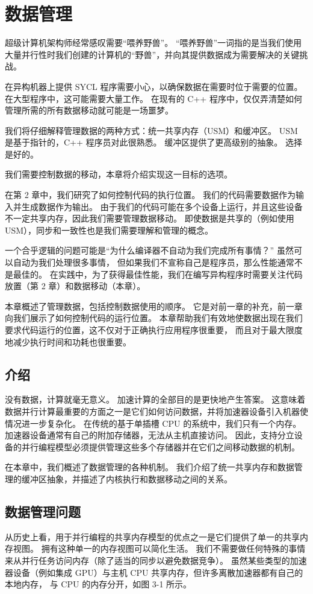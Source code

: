 \section{数据管理}
超级计算机架构师经常感叹需要“喂养野兽”。 
“喂养野兽”一词指的是当我们使用大量并行性时我们创建的计算机的“野兽”，并向其提供数据成为需要解决的关键挑战。

在异构机器上提供 SYCL 程序需要小心，以确保数据在需要时位于需要的位置。 
在大型程序中，这可能需要大量工作。 在现有的 C++ 程序中，仅仅弄清楚如何管理所需的所有数据移动就可能是一场噩梦。

我们将仔细解释管理数据的两种方式：统一共享内存（USM）和缓冲区。 
USM 是基于指针的，C++ 程序员对此很熟悉。 缓冲区提供了更高级别的抽象。 选择是好的。

我们需要控制数据的移动，本章将介绍实现这一目标的选项。

在第 2 章中，我们研究了如何控制代码的执行位置。 我们的代码需要数据作为输入并生成数据作为输出。 
由于我们的代码可能在多个设备上运行，并且这些设备不一定共享内存，因此我们需要管理数据移动。 
即使数据是共享的（例如使用 USM），同步和一致性也是我们需要理解和管理的概念。

一个合乎逻辑的问题可能是“为什么编译器不自动为我们完成所有事情？” 虽然可以自动为我们处理很多事情，
但如果我们不宣称自己是程序员，那么性能通常不是最佳的。 
在实践中，为了获得最佳性能，我们在编写异构程序时需要关注代码放置（第 2 章）和数据移动（本章）。

本章概述了管理数据，包括控制数据使用的顺序。 它是对前一章的补充，前一章向我们展示了如何控制代码的运行位置。 
本章帮助我们有效地使数据出现在我们要求代码运行的位置，这不仅对于正确执行应用程序很重要，
而且对于最大限度地减少执行时间和功耗也很重要。


\subsection{介绍}
没有数据，计算就毫无意义。 加速计算的全部目的是更快地产生答案。 
这意味着数据并行计算最重要的方面之一是它们如何访问数据，并将加速器设备引入机器使情况进一步复杂化。 
在传统的基于单插槽 CPU 的系统中，我们只有一个内存。 加速器设备通常有自己的附加存储器，无法从主机直接访问。 
因此，支持分立设备的并行编程模型必须提供管理这些多个存储器并在它们之间移动数据的机制。

在本章中，我们概述了数据管理的各种机制。 
我们介绍了统一共享内存和数据管理的缓冲区抽象，并描述了内核执行和数据移动之间的关系。

\subsection{数据管理问题}
从历史上看，用于并行编程的共享内存模型的优点之一是它们提供了单一的共享内存视图。 拥有这种单一的内存视图可以简化生活。 
我们不需要做任何特殊的事情来从并行任务访问内存（除了适当的同步以避免数据竞争）。 
虽然某些类型的加速器设备（例如集成 GPU）与主机 CPU 共享内存，但许多离散加速器都有自己的本地内存，
与 CPU 的内存分开，如图 3-1 所示。

